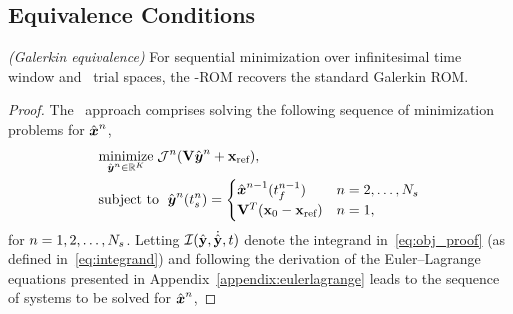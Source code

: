 \subsection{Equivalence Conditions}
\begin{theorem}\label{theorem:galerkin_equiv}\textit{(Galerkin equivalence)}
For sequential minimization over infinitesimal time window and \spatialAcronym\ trial spaces, the \methodAcronym-ROM recovers the standard Galerkin ROM.
\end{theorem}
\begin{proof}
The \methodAcronym\ approach comprises solving the following sequence of minimization problems for $\genstateArgnt{n}$,
\begin{equation}\label{eq:obj_proof}
\begin{split}
      & \underset{\genstateyArgnt{n} \in \RR{\romdim}}{\text{minimize}}\; \mathcal{J}^n(\basisspace \genstateyArgnt{n} + \stateIntercept), \\ 
      & \text{subject to }\; \genstateyArg{n}{\timeStartArg{n}} =
\begin{cases} \genstateArg{n-1}{\timeEndArg{n-1}} & n = 2,\ldots,\nslabs \\
\genstateIC & n=1, \end{cases} 
\end{split}
\end{equation}
for $n = 1,2,\ldots,\nslabs$. Letting $\minintegrandArg{n}(\genstateyDiscrete,\dot{\genstateyDiscrete},t)$ denote the integrand in~\eqref{eq:obj_proof} (as defined in~\eqref{eq:integrand}) and following the derivation of the Euler--Lagrange equations presented in Appendix~\ref{appendix:eulerlagrange} leads to the sequence of systems to be solved for $\genstate^n$,


\end{proof}
